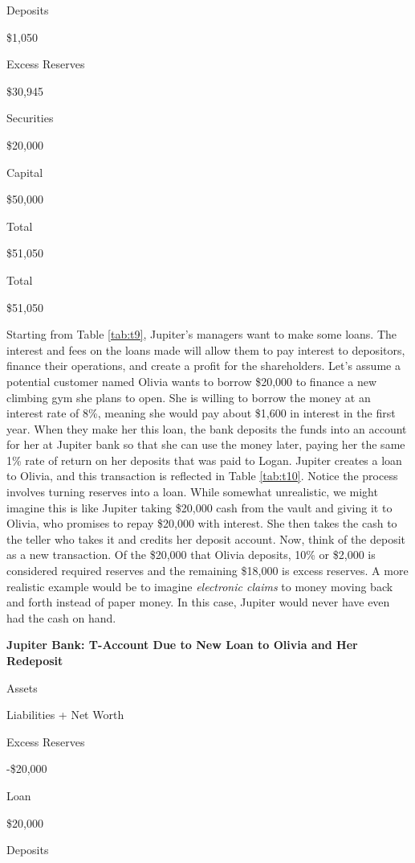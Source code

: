 \documentclass[
]{book}
\begin{document}
Deposits

\$1,050

Excess Reserves

\$30,945

Securities

\$20,000

Capital

\$50,000

Total

\$51,050

Total

\$51,050

Starting from Table \ref{tab:t9}, Jupiter's managers want to make some loans. The interest and fees on the loans made will allow them to pay interest to depositors, finance their operations, and create a profit for the shareholders. Let's assume a potential customer named Olivia wants to borrow \$20,000 to finance a new climbing gym she plans to open. She is willing to borrow the money at an interest rate of 8\%, meaning she would pay about \$1,600 in interest in the first year. When they make her this loan, the bank deposits the funds into an account for her at Jupiter bank so that she can use the money later, paying her the same 1\% rate of return on her deposits that was paid to Logan. Jupiter creates a loan to Olivia, and this transaction is reflected in Table \ref{tab:t10}. Notice the process involves turning reserves into a loan. While somewhat unrealistic, we might imagine this is like Jupiter taking \$20,000 cash from the vault and giving it to Olivia, who promises to repay \$20,000 with interest. She then takes the cash to the teller who takes it and credits her deposit account. Now, think of the deposit as a new transaction. Of the \$20,000 that Olivia deposits, 10\% or \$2,000 is considered required reserves and the remaining \$18,000 is excess reserves. A more realistic example would be to imagine \emph{electronic claims} to money moving back and forth instead of paper money. In this case, Jupiter would never have even had the cash on hand.

\label{tab:t10}\textbf{Jupiter Bank: T-Account Due to New Loan to Olivia and Her Redeposit}

Assets

Liabilities + Net Worth

Excess Reserves

-\$20,000

Loan

\$20,000

Deposits
\end{document}
